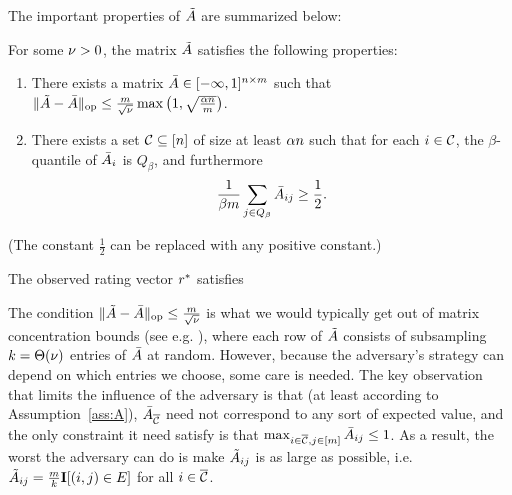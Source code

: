 The important properties of $\tilde{A}$ are summarized below:
\begin{assumption}
\label{ass:A}
For some $\nu > 0$, the matrix $\tilde{A}$ satisfies the following properties:
\begin{enumerate}
\item There exists a matrix $\bar{A} \in [-\infty,1]^{n \times m}$ such that 
      $\|\tilde{A} - \bar{A}\|_{\mathrm{op}} \leq \frac{m}{\sqrt{\nu}}\max\left( 1, \sqrt{\frac{\alpha n}{m}} \right)$.
\item There exists a set $\mathcal{C} \subseteq [n]$ of size at least $\alpha n$ 
      such that for each $i \in \mathcal{C}$, the $\beta$-quantile of $\bar{A}_i$ is 
      $Q_{\beta}$, and furthermore
      \[ \frac{1}{\beta m} \sum_{j \in Q_{\beta}} \bar{A}_{ij} \geq \frac{1}{2}. \]
\end{enumerate}
\end{assumption}
(The constant $\frac{1}{2}$ can be replaced with any positive constant.)
\begin{assumption}
\label{ass:r}
The observed rating vector $r^*$ satisfies 
\end{assumption}
The condition $\|\tilde{A} - \bar{A}\|_{\mathrm{op}} \leq \frac{m}{\sqrt{\nu}}$ is what 
we would typically get out of matrix concentration bounds (see e.g. \citet{todo}), 
where each row of $\tilde{A}$ consists of subsampling $k = \Theta(\nu)$ entries 
of $\bar{A}$ at random. However, because the adversary's strategy can depend 
on which entries we choose, some care is needed. The key observation that limits 
the influence of the adversary is that (at least according to Assumption~\ref{ass:A}), $\bar{A}_{\overline{\mathcal{C}}}$ need not correspond to any sort of expected value, 
and the only constraint it need satisfy is that 
$\max_{i \in \overline{\mathcal{C}}, j \in [m]} \bar{A}_{ij} \leq 1$. As a result, the worst 
the adversary can do is make $\tilde{A}_{ij}$ is as large as possible, i.e. 
$\tilde{A}_{ij} = \frac{m}{k}\mathbf{I}[(i,j) \in E]$ for all $i \in \overline{\mathcal{C}}$.

